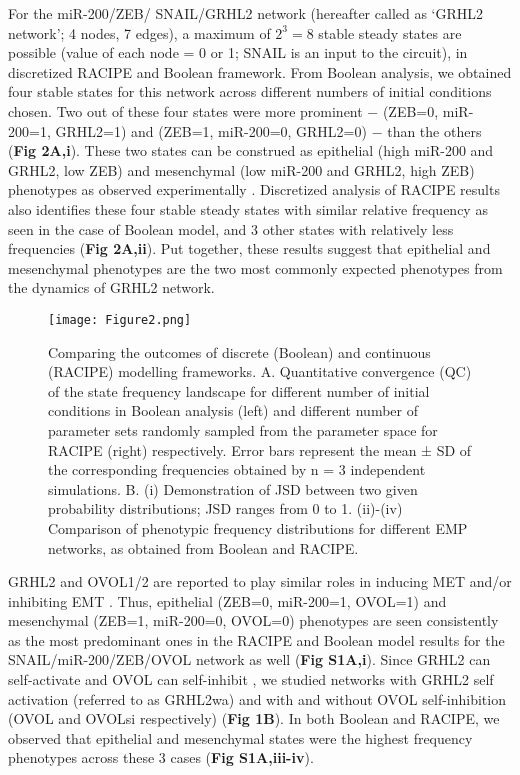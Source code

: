 \documentclass[preprint,review,12pt]{elsarticle}
\begin{document}
	
	For the miR-200/ZEB/ SNAIL/GRHL2 network (hereafter called as ‘GRHL2 network’; 4 nodes, 7 edges), a maximum of $2^3 = 8$ stable steady states are possible (value of each node = 0 or 1; SNAIL is an input to the circuit), in discretized RACIPE and Boolean framework. From Boolean analysis, we obtained four stable states for this network across different numbers of initial conditions chosen. Two out of these four states were more prominent $-$ (ZEB=0, miR-200=1, GRHL2=1) and (ZEB=1, miR-200=0, GRHL2=0) $-$ than the others (\textbf{Fig 2A,i}). These two states can be construed as epithelial (high miR-200 and GRHL2, low ZEB) and mesenchymal  (low miR-200 and GRHL2, high ZEB) phenotypes as observed experimentally \cite{Brabletz2010, Mooney2017}. Discretized analysis of RACIPE results also identifies these four stable steady states with similar relative frequency as seen in the case of Boolean model, and 3 other states with relatively less frequencies (\textbf{Fig 2A,ii}). Put together, these results suggest that epithelial and mesenchymal phenotypes are the two most commonly expected phenotypes from the dynamics of GRHL2 network. 
	
	
	\begin{figure}[!ht]
		\centering
		\texttt{[image: Figure2.png]}
		\caption{Comparing the outcomes of discrete (Boolean) and continuous (RACIPE) modelling frameworks.
			A.	Quantitative convergence (QC) of the state frequency landscape for different number of initial conditions in Boolean analysis (left) and different number of parameter sets randomly sampled from the parameter space for RACIPE (right) respectively. Error bars represent the mean ± SD of the corresponding frequencies obtained by n = 3 independent simulations. 
			B.	(i) Demonstration of JSD between two given probability distributions; JSD ranges from 0 to 1. (ii)-(iv) Comparison of phenotypic frequency distributions for different EMP networks, as obtained from Boolean and RACIPE.}
		\label{figure2}
	\end{figure}


	
	
	GRHL2 and OVOL1/2 are reported to play similar roles in inducing MET and/or inhibiting EMT \cite{Jolly2016, Jia2015, Roca2013}. Thus, epithelial (ZEB=0, miR-200=1, OVOL=1) and mesenchymal (ZEB=1, miR-200=0, OVOL=0) phenotypes are seen consistently as the most predominant ones in the RACIPE and Boolean model results for the SNAIL/miR-200/ZEB/OVOL network as well (\textbf{Fig S1A,i}). 
	Since GRHL2 can self-activate \cite{Mehrazarin2015} and OVOL can self-inhibit \cite{Nair2007}, we studied networks with GRHL2 self activation (referred to as GRHL2wa) and with and without OVOL self-inhibition (OVOL and OVOLsi respectively) (\textbf{Fig 1B}). In both Boolean and RACIPE, we observed that epithelial and mesenchymal states were the highest frequency phenotypes across these 3 cases (\textbf{Fig S1A,iii-iv}).
	
\end{document}
